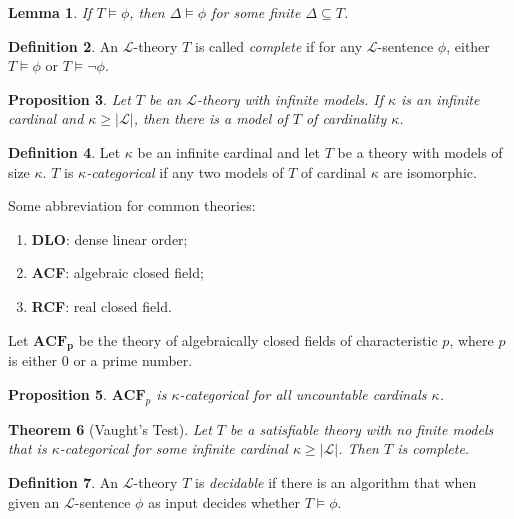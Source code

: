 \documentclass{amsart}
\newtheorem{theorem}{Theorem}[subsection]
\newtheorem{lemma}[theorem]{Lemma}
\newtheorem{proposition}[theorem]{Proposition}
\theoremstyle{definition}
\newtheorem{definition}[theorem]{Definition}
\numberwithin{equation}{section}
\begin{document}
\begin{lemma}
    If $T \models \phi$, then $\Delta \models \phi$ for some finite $\Delta \subseteq T$.
\end{lemma}

\begin{definition}
    An $\mathcal{L}$-theory $T$ is called \emph{complete} if for any $\mathcal{L}$-sentence $\phi$,
    either $T \models \phi$ or $T \models \neg\phi$.
\end{definition}

\begin{proposition}
    Let $T$ be an $\mathcal{L}$-theory with infinite models.
    If $\kappa$ is an infinite cardinal and $\kappa \ge |\mathcal{L}|$,
    then there is a model of $T$ of cardinality $\kappa$.
\end{proposition}

\begin{definition}
    Let $\kappa$ be an infinite cardinal and let $T$ be a theory with models of size $\kappa$.
    $T$ is \emph{$\kappa$-categorical} if any two models of $T$ of cardinal $\kappa$ are isomorphic.
\end{definition}

Some abbreviation for common theories:
\begin{enumerate}[label = {}]
    \item \textbf{DLO}: dense linear order;
    \item \textbf{ACF}: algebraic closed field;
    \item \textbf{RCF}: real closed field.
\end{enumerate}

Let $\mathbf{ACF_p}$ be the theory of algebraically closed fields of characteristic $p$,
where $p$ is either $0$ or a prime number.

\begin{proposition} 
    $\mathbf{ACF}_p$ is $\kappa$-categorical for all uncountable cardinals $\kappa$.
\end{proposition}

\begin{theorem}[Vaught's Test]
    Let $T$ be a satisfiable theory with no finite models that is 
    $\kappa$-categorical for some infinite cardinal $\kappa \ge |\mathcal{L}|$.
    Then $T$ is complete.
\end{theorem}

\begin{definition}
    An $\mathcal{L}$-theory $T$ is \emph{decidable} if there is an algorithm that
    when given an $\mathcal{L}$-sentence $\phi$ as input decides whether $T \models \phi$.
\end{definition}
\end{document}
